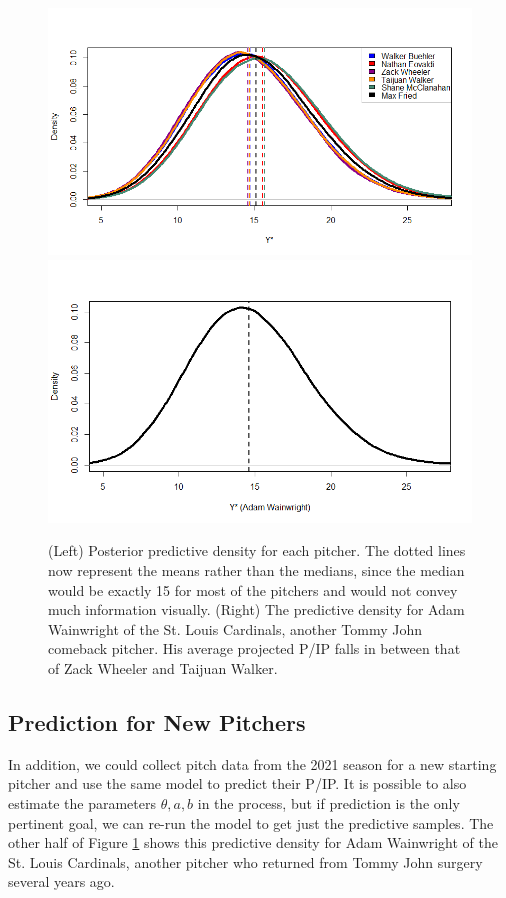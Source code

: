 \documentclass{article}
\begin{document}
\begin{figure}[h]
    \centering
    \includegraphics[scale=0.38]{figs/preds.png}
    \includegraphics[scale=0.37]{figs/ww.png}
    \caption{(Left) Posterior predictive density for each pitcher. The dotted lines now represent the means rather than the medians, since the median would be exactly 15 for most of the pitchers and would not convey much information visually. (Right) The predictive density for Adam Wainwright of the St. Louis Cardinals, another Tommy John comeback pitcher. His average projected P/IP falls in between that of Zack Wheeler and Taijuan Walker. }
    \label{fig:preds}
\end{figure}


\subsection{Prediction for New Pitchers}

In addition, we could collect pitch data from the 2021 season for a new starting pitcher and use the same model to predict their P/IP. It is possible to also estimate the parameters $\theta, a, b$ in the process, but if prediction is the only pertinent goal, we can re-run the model to get just the predictive samples. The other half of Figure \ref{fig:preds} shows this predictive density for Adam Wainwright of the St. Louis Cardinals, another pitcher who returned from Tommy John surgery several years ago.
\end{document}
